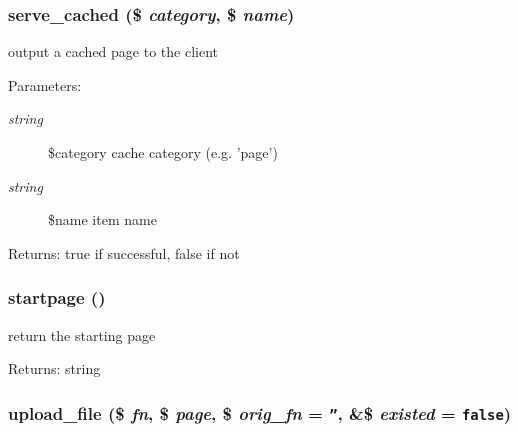 \hypertarget{common_8inc_8php_ac90387dcab722e243df2d083f8d6a00}{
\subsubsection[{serve\_\-cached}]{\setlength{\rightskip}{0pt plus 5cm}serve\_\-cached (\$ {\em category}, \/  \$ {\em name})}}
\label{common_8inc_8php_ac90387dcab722e243df2d083f8d6a00}


output a cached page to the client

\begin{Desc}
\item[Parameters:]
\begin{description}
\item[{\em string}]\$category cache category (e.g. 'page') \item[{\em string}]\$name item name \end{description}
\end{Desc}
\begin{Desc}
\item[Returns:]true if successful, false if not \end{Desc}
\hypertarget{common_8inc_8php_0a3ee1e9beca572266648f17b9c4c75f}{
\subsubsection[{startpage}]{\setlength{\rightskip}{0pt plus 5cm}startpage ()}}
\label{common_8inc_8php_0a3ee1e9beca572266648f17b9c4c75f}


return the starting page

\begin{Desc}
\item[Returns:]string \end{Desc}
\hypertarget{common_8inc_8php_4659077c34b709eec75f9897ea07e55a}{
\subsubsection[{upload\_\-file}]{\setlength{\rightskip}{0pt plus 5cm}upload\_\-file (\$ {\em fn}, \/  \$ {\em page}, \/  \$ {\em orig\_\-fn} = {\tt ''}, \/  \&\$ {\em existed} = {\tt false})}}
\label{common_8inc_8php_4659077c34b709eec75f9897ea07e55a}


